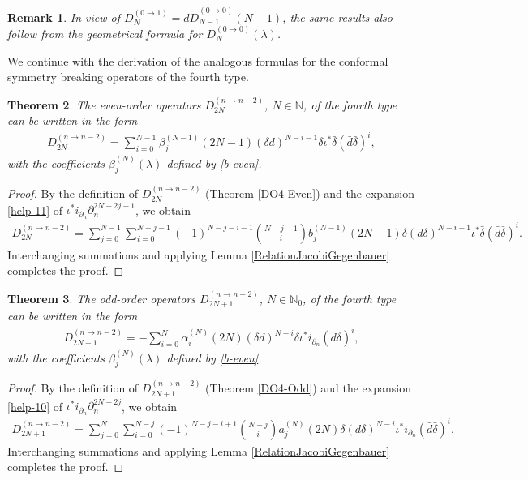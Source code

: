 \documentclass[a4paper,12pt,reqno]{amsart}
\newtheorem{theorem}{Theorem}
\newtheorem{bem}[theorem]{Remark}
\numberwithin{theorem}{subsection}
\numberwithin{equation}{section}
\begin{document}
\begin{bem} In view of $D_{N}^{(0\to 1)} = {d} \dot{D}_{N-1}^{(0\to 0)}(N-1)$, the same
results also follow from the geometrical formula for $D_N^{(0 \to
0)}(\lambda)$.
\end{bem}

We continue with the derivation of the analogous formulas for the conformal
symmetry breaking operators of the fourth type.

\begin{theorem}\label{CSBO-4-even} The even-order operators $D_{2N}^{(n\to n-2)}$, $N\in{\mathbb{N}}$,
of the fourth type can be written in the form
\begin{align*}
   D_{2N}^{(n\to n-2)} = \sum_{i=0}^{N-1} \beta_j^{(N-1)}(2N\!-\!1)
   (\delta{d})^{N-i-1}\delta\iota^*\bar{\delta} (\bar{d}\bar{\delta})^i,
\end{align*}
with the coefficients $\beta_j^{(N)}(\lambda)$ defined by \eqref{b-even}.
\end{theorem}

\begin{proof} By the definition of $D_{2N}^{(n\to n-2)}$ (Theorem \ref{DO4-Even}) and the expansion
\eqref{help-11} of $\iota^* i_{\partial_n}\partial_n^{2N-2j-1}$, we obtain
\begin{align*}
   D_{2N}^{(n\to n-2)}=\sum_{j=0}^{N-1}\sum_{i=0}^{N-j-1}(-1)^{N-j-i-1} \binom{N-j-1}{i}
   b_j^{(N-1)}(2N\!-\!1) \delta ({d}\delta)^{N-i-1}\iota^*\bar{\delta}(\bar{d}\bar{\delta})^i.
\end{align*}
Interchanging summations and applying Lemma \ref{RelationJacobiGegenbauer}
completes the proof.
\end{proof}

\begin{theorem}\label{CSBO-4-odd} The odd-order operators $D_{2N+1}^{(n\to n-2)}$, $N\in{\mathbb{N}}_0$,
of the fourth type can be written in the form
\begin{align*}
   D_{2N+1}^{(n\to n-2)} = -\sum_{i=0}^{N} \alpha_i^{(N)}(2N)
   (\delta{d})^{N-i} \delta\iota^*i_{\partial_n}(\bar{d}\bar{\delta})^i,
\end{align*}
with the coefficients $\beta_j^{(N)}(\lambda)$ defined by \eqref{b-even}.
\end{theorem}

\begin{proof} By the definition of $D_{2N+1}^{(n\to n-2)}$ (Theorem \ref{DO4-Odd}) and
the expansion \eqref{help-10} of $\iota^* i_{\partial_n}\partial_n^{2N-2j}$, we
obtain
\begin{align*}
   D_{2N+1}^{(n\to n-2)}=\sum_{j=0}^{N}\sum_{i=0}^{N-j}(-1)^{N-j-i+1} \binom{N-j}{i}
   a_j^{(N)}(2N)\delta ({d}\delta)^{N-i}\iota^*i_{\partial_n}(\bar{d}\bar{\delta})^i.
\end{align*}
Interchanging summations and applying Lemma \ref{RelationJacobiGegenbauer}
completes the proof.
\end{proof}
\end{document}
